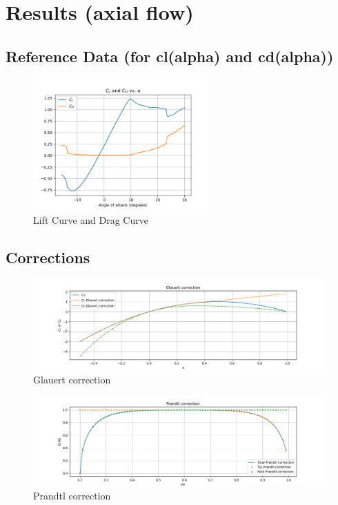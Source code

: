 \chapter{Results (axial flow)}

\section{Reference Data (for cl(alpha) and cd(alpha))}
\begin{figure}[H]
    \centering
    \includegraphics[width=0.6\textwidth]{Figures/CLCD_interpolation.png}
    \caption{Lift Curve and Drag Curve}
    \label{fig:lift curve and drag curve}
\end{figure}

\section{Corrections}
\begin{figure}[H]
    \centering
    \includegraphics[width=\textwidth]{Figures/Glauert_correct.png}
    \caption{Glauert correction}
    \label{fig:glauert correction}
\end{figure}
\begin{figure}[H]
    \centering
    \includegraphics[width=\textwidth]{Figures/prandtl_correct.png}
    \caption{Prandtl correction}
    \label{fig:prandtl correction}
\end{figure}

